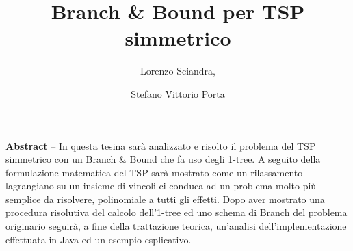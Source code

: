 \documentclass[
	article,			%
	12pt,				%
	oneside,			%
	a4paper,			%
	english,			%
	italian,				%
	sumario=tradicional,
	]{abntex2}
\title{Branch \& Bound per TSP simmetrico}
\author{Lorenzo Sciandra,\and Stefano Vittorio Porta}
\begin{document}
\textual

\pagestyle{meuestilo}

\frenchspacing 

\maketitle
\thispagestyle{meuestilo}

\begin{changemargin}{1cm}{1cm} 
 \textbf{Abstract} – In questa tesina sarà analizzato e risolto il problema del TSP simmetrico con un Branch \& Bound che fa uso degli 1-tree. A seguito della formulazione matematica del TSP sarà mostrato come un rilassamento lagrangiano su un insieme di vincoli ci conduca ad un problema molto più semplice da risolvere, polinomiale a tutti gli effetti. Dopo aver mostrato una procedura risolutiva del calcolo dell'1-tree ed uno schema di Branch del problema originario seguirà, a fine della trattazione teorica, un'analisi dell'implementazione effettuata in Java ed un esempio esplicativo.

 \vspace{\onelineskip}
 
 \noindent
\end{changemargin}


\end{document}
